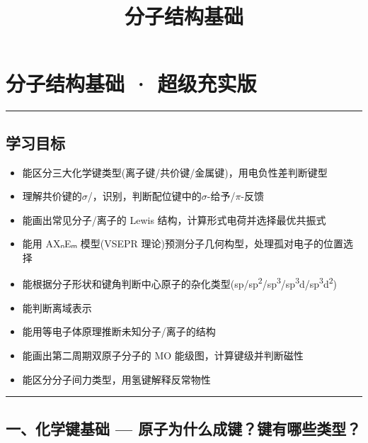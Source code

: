 \documentclass[a4paper,11pt]{ctexart}
\title{分子结构基础}
\date{}
\providecommand{\tightlist}{\setlength{\itemsep}{0pt}\setlength{\parskip}{0pt}}
\newcommand{\箭}{\ensuremath{\rightarrow}}
\newcommand{\左箭}{\ensuremath{\leftarrow}}
\newcommand{\上箭}{\ensuremath{\uparrow}}
\newcommand{\下箭}{\ensuremath{\downarrow}}
\newcommand{\衡}{\ensuremath{\rightleftharpoons}}
\newcommand{\双箭}{\ensuremath{\leftrightarrow}}
\newcommand{\约等于}{\ensuremath{\approx}}
\newcommand{\小于等于}{\ensuremath{\leq}}
\newcommand{\大于等于}{\ensuremath{\geq}}
\newcommand{\不等于}{\ensuremath{\neq}}
\newcommand{\西格马}{\ensuremath{\sigma}}
\newcommand{\派}{\ensuremath{\pi}}
\begin{document}
\maketitle
\tableofcontents
\newpage
\section{分子结构基础 · 超级充实版}\label{ux5206ux5b50ux7ed3ux6784ux57faux7840-ux8d85ux7ea7ux5145ux5b9eux7248}

\begin{center}\rule{0.5\linewidth}{0.5pt}\end{center}

\subsection{学习目标}\label{ux5b66ux4e60ux76eeux6807}

\begin{itemize}
\tightlist
\item
  能区分三大化学键类型(离子键/共价键/金属键)，用电负性差判断键型
\item
  理解共价键的\西格马/，识别，判断配位键中的\西格马-给予/\派-反馈
\item
  能画出常见分子/离子的 Lewis 结构，计算形式电荷并选择最优共振式
\item
  能用 AXₙEₘ 模型(VSEPR 理论)预测分子几何构型，处理孤对电子的位置选择
\item
  能根据分子形状和键角判断中心原子的杂化类型(sp/sp\textsuperscript{2}/sp\textsuperscript{3}/sp\textsuperscript{3}d/sp\textsuperscript{3}d\textsuperscript{2})
\item
  能判断离域  表示
\item
  能用等电子体原理推断未知分子/离子的结构
\item
  能画出第二周期双原子分子的 MO 能级图，计算键级并判断磁性
\item
  能区分分子间力类型，用氢键解释反常物性
\end{itemize}

\begin{center}\rule{0.5\linewidth}{0.5pt}\end{center}

\subsection{一、化学键基础 --- 原子为什么成键？键有哪些类型？}\label{ux4e00ux5316ux5b66ux952eux57faux7840-ux539fux5b50ux4e3aux4ec0ux4e48ux6210ux952eux952eux6709ux54eaux4e9bux7c7bux578b}
\end{document}
